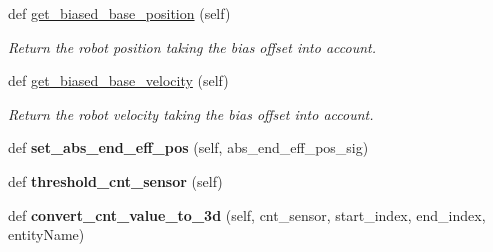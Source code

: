 \begin{DoxyCompactItemize}
\item 
def \hyperlink{classpython_1_1dg__tools_1_1leg__impedance__control_1_1quad__leg__impedance__controller_1_1QuadrupedComControl_a471495c1adac63c6cb9a521fea0b52d6}{get\+\_\+biased\+\_\+base\+\_\+position} (self)
\begin{DoxyCompactList}\small\item\em Return the robot position taking the bias offset into account. \end{DoxyCompactList}\item 
def \hyperlink{classpython_1_1dg__tools_1_1leg__impedance__control_1_1quad__leg__impedance__controller_1_1QuadrupedComControl_af130be175b4257723b48248e1ec41ab4}{get\+\_\+biased\+\_\+base\+\_\+velocity} (self)
\begin{DoxyCompactList}\small\item\em Return the robot velocity taking the bias offset into account. \end{DoxyCompactList}\item 
def {\bfseries set\+\_\+abs\+\_\+end\+\_\+eff\+\_\+pos} (self, abs\+\_\+end\+\_\+eff\+\_\+pos\+\_\+sig)\hypertarget{classpython_1_1dg__tools_1_1leg__impedance__control_1_1quad__leg__impedance__controller_1_1QuadrupedComControl_a722398d4df248546c7316ef3e4cf35ec}{}\label{classpython_1_1dg__tools_1_1leg__impedance__control_1_1quad__leg__impedance__controller_1_1QuadrupedComControl_a722398d4df248546c7316ef3e4cf35ec}

\item 
def {\bfseries threshold\+\_\+cnt\+\_\+sensor} (self)\hypertarget{classpython_1_1dg__tools_1_1leg__impedance__control_1_1quad__leg__impedance__controller_1_1QuadrupedComControl_a9c37016b0e903660cbf38885b9bee52e}{}\label{classpython_1_1dg__tools_1_1leg__impedance__control_1_1quad__leg__impedance__controller_1_1QuadrupedComControl_a9c37016b0e903660cbf38885b9bee52e}

\item 
def {\bfseries convert\+\_\+cnt\+\_\+value\+\_\+to\+\_\+3d} (self, cnt\+\_\+sensor, start\+\_\+index, end\+\_\+index, entity\+Name)\hypertarget{classpython_1_1dg__tools_1_1leg__impedance__control_1_1quad__leg__impedance__controller_1_1QuadrupedComControl_aebd187dc86fdc93f43c8991c14af8c52}{}\label{classpython_1_1dg__tools_1_1leg__impedance__control_1_1quad__leg__impedance__controller_1_1QuadrupedComControl_aebd187dc86fdc93f43c8991c14af8c52}


\end{DoxyCompactItemize}
